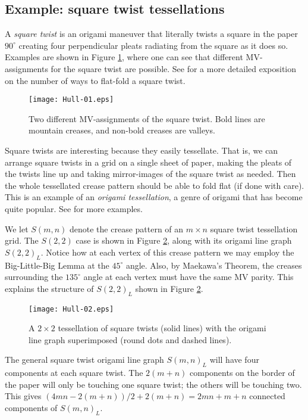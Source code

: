 \documentclass{amsart}
\theoremstyle{definition}
\begin{document}
\subsection{Example: square twist tessellations}

A {\em square twist} is an origami maneuver that literally twists a square in the paper $90^\circ$ creating four perpendicular pleats radiating from the square as it does so.  Examples are shown in Figure \ref{fig:sqtwist}, where one can see that different MV-assignments for the square twist are possible.  See \cite{H1} for a more detailed exposition on the number of ways to flat-fold a square twist.

\begin{figure}[htp]
\centerline{\texttt{[image: Hull-01.eps]}}
\caption{Two different MV-assignments of the square twist. Bold lines are mountain creases, and non-bold creases are valleys.}\label{fig:sqtwist}
\end{figure}

Square twists are interesting because they easily tessellate.  That is, we can arrange square twists in a grid on a single sheet of paper, making the pleats of the twists line up and taking mirror-images of the square twist as needed.  Then the whole tessellated crease pattern should be able to fold flat (if done with care).  This is an example of an {\em origami tessellation}, a genre of origami that has become quite popular.  See \cite{Gjerde} for more examples.

We let $S(m,n)$ denote the crease pattern of an $m\times n$ square twist tessellation grid.  The $S(2,2)$ case is shown in Figure \ref{fig:sqtwistcolor}, along with its origami line graph $S(2,2)_L$.  Notice how at each vertex of this crease pattern we may employ the Big-Little-Big Lemma at the $45^\circ$ angle.  Also, by Maekawa's Theorem, the creases surrounding the $135^\circ$ angle at each vertex must have the same MV parity.  This explains the structure of $S(2,2)_L$ shown in Figure \ref{fig:sqtwistcolor}.

\begin{figure}
\centerline{\texttt{[image: Hull-02.eps]}}
\caption{A $2\times 2$ tessellation of square twists (solid lines) with the origami line graph superimposed (round dots and dashed lines).}\label{fig:sqtwistcolor}
\end{figure}

The general square twist origami line graph $S(m,n)_L$ will have four components at each square twist.  The $2(m+n)$ components on the border of the paper will only be touching one square twist; the others will be touching two.  This gives $(4mn-2(m+n))/2+2(m+n) = 2mn + m + n$ connected components of $S(m,n)_L$.
\end{document}

